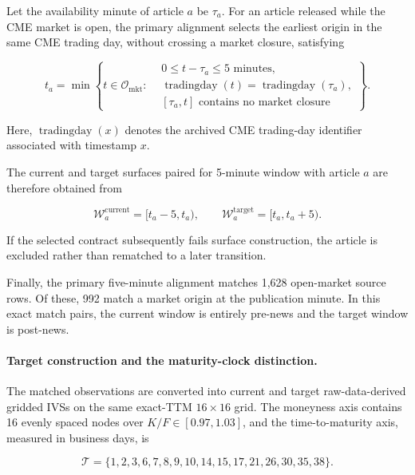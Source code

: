 Let the availability minute of article $a$ be $\tau_a$. For an article released while the CME market is open, the primary alignment selects the earliest origin in the same CME trading day, without crossing a market closure, satisfying

\begin{equation}\label{eq:ch3:news_market_origin}
t_a
=
\min\left\{
t\in\mathcal O_{\mathrm{mkt}}:
\begin{aligned}
&0\leq t-\tau_a\leq5\text{ minutes},\\
&\operatorname{tradingday}(t)=\operatorname{tradingday}(\tau_a),\\
&[\tau_a,t]\text{ contains no market closure}
\end{aligned}
\right\}.
\end{equation}

Here, $\operatorname{tradingday}(x)$ denotes the archived CME trading-day identifier associated with timestamp $x$.

The current and target surfaces paired for 5-minute window with article $a$ are therefore obtained from

\begin{equation}\label{eq:ch3:news_market_windows}
\mathcal W^{\mathrm{current}}_a=[t_a-5,t_a),
\qquad
\mathcal W^{\mathrm{target}}_a=[t_a,t_a+5).
\end{equation}

If the selected contract subsequently fails surface construction, the article is excluded rather than rematched to a later transition. 


Finally, the primary five-minute alignment matches 1,628 open-market source rows. Of these, 992 match a market origin at the publication minute. In this exact match pairs, the current window is entirely pre-news and the target window is post-news. 




\paragraph*{Target construction and the maturity-clock distinction.}

The matched observations are converted into current and target
raw-data-derived gridded IVSs on the same exact-TTM $16\times16$ grid. The moneyness axis contains 16 evenly spaced nodes over $K/F\in[0.97,1.03]$, and the time-to-maturity axis, measured in business days, is

\begin{equation}\label{eq:ch3:exact_ttm_nodes}
\mathcal T
=
\{1,2,3,6,7,8,9,10,14,15,17,21,26,30,35,38\}.
\end{equation}

